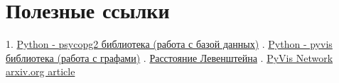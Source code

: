 \documentclass[12pt]{article}
\begin{document}
\section*{Полезные ссылки}
1. \href{https://zetcode.com/python/psycopg2/}{\color{blue}Python - psycopg2 библиотека (работа с базой данных)} . \href{https://pyvis.readthedocs.io/en/latest/}{\color{blue}Python - pyvis библиотека (работа с графами)} . \href{https://neerc.ifmo.ru/wiki/index.php?title=%D0%97%D0%B0%D0%B4%D0%B0%D1%87%D0%B0_%D0%BE_%D1%80%D0%B0%D1%81%D1%81%D1%82%D0%BE%D1%8F%D0%BD%D0%B8%D0%B8_%D0%94%D0%B0%D0%BC%D0%B5%D1%80%D0%B0%D1%83-%D0%9B%D0%B5%D0%B2%D0%B5%D0%BD%D1%88%D1%82%D0%B5%D0%B9%D0%BD%D0%B0}{\color{blue}Расстояние Левенштейна} . \href{https://arxiv.org/pdf/2006.04951.pdf}{\color{blue}PyVis Network arxiv.org article} \newline
\end{document}
